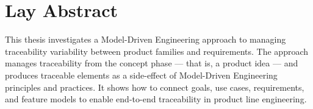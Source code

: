 \chapter*{Lay Abstract}

This thesis investigates a Model-Driven Engineering approach to managing traceability variability between product families and requirements. The approach manages traceability from the concept phase — that is, a product idea — and produces traceable elements as a side-effect of Model-Driven Engineering principles and practices. It shows how to connect goals, use cases, requirements, and feature models to enable end-to-end traceability in product line engineering.